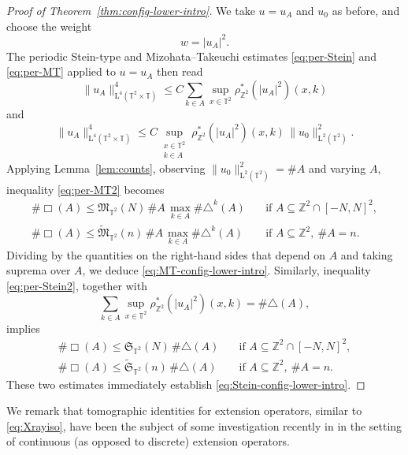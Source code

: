 \documentclass[10pt,a4paper]{amsart}
\numberwithin{equation}{section}
\renewcommand{\leq}{\leqslant}
\begin{document}
\begin{proof}[Proof of Theorem~\ref{thm:config-lower-intro}]
We take $u=u_A$ and $u_0$ as before, and choose the weight
\begin{equation}\label{eq:2Dweight}
w=|u_A|^2.
\end{equation}
The periodic Stein-type and Mizohata--Takeuchi estimates \eqref{eq:per-Stein} and \eqref{eq:per-MT} applied to $u=u_A$ then read
\begin{equation}\label{eq:per-Stein2}
\|u_A\|_{\mathrm{L}^4(\mathbb{T}^2\times\mathbb{T})}^4 \leq C \sum_{k\in A} \sup_{x\in\mathbb{T}^2} \rho^{\ast}_{\mathbb{Z}^2}(|u_A|^2)(x,k)
\end{equation}
and
\begin{equation}\label{eq:per-MT2}
\|u_A\|_{\mathrm{L}^4(\mathbb{T}^2\times\mathbb{T})}^4 \leq C \sup_{\substack{x\in\mathbb{T}^2\\ k\in A}} \rho^{\ast}_{\mathbb{Z}^2}(|u_A|^2)(x,k) \,\|u_0\|_{\mathrm{L}^2(\mathbb{T}^2)}^2.
\end{equation}
Applying Lemma~\ref{lem:counts}, observing $\|u_0\|_{\mathrm{L}^2(\mathbb{T}^2)}^2=\#A$ and varying $A$, inequality \eqref{eq:per-MT2} becomes
\begin{align*} 
\#\Box(A) \leq \mathfrak{M}_{\mathbb{T}^2}(N) \,\#A \,\max_{k\in A} \#\triangle^k(A) & \quad \text{if } A\subseteq\mathbb{Z}^2\cap[-N,N]^2, \\
\#\Box(A) \leq \widetilde{\mathfrak{M}}_{\mathbb{T}^2}(n) \,\#A \,\max_{k\in A} \#\triangle^k(A) & \quad \text{if } A\subseteq\mathbb{Z}^2,\ \#A=n. 
\end{align*}
Dividing by the quantities on the right-hand sides that depend on $A$ and taking suprema over $A$, we deduce \eqref{eq:MT-config-lower-intro}.
Similarly, inequality \eqref{eq:per-Stein2}, together with
\[ \sum_{k\in A} \sup_{x\in\mathbb{T}^2}\rho^{\ast}_{\mathbb{Z}^2}(|u_A|^2)(x,k) = \#\triangle(A), \]
implies
\begin{align*} 
\#\Box(A) \leq \mathfrak{S}_{\mathbb{T}^2}(N) \,\#\triangle(A) & \quad \text{if } A\subseteq\mathbb{Z}^2\cap[-N,N]^2, \\
\#\Box(A) \leq \widetilde{\mathfrak{S}}_{\mathbb{T}^2}(n) \,\#\triangle(A) & \quad \text{if } A\subseteq\mathbb{Z}^2,\ \#A=n. 
\end{align*}
These two estimates immediately establish \eqref{eq:Stein-config-lower-intro}.
\end{proof}
We remark that tomographic identities for extension operators, similar to \eqref{eq:Xrayiso}, have been the subject of some investigation recently in \cite{BN,BNS,BGNO} in the setting of continuous (as opposed to discrete) extension operators.
\end{document}
